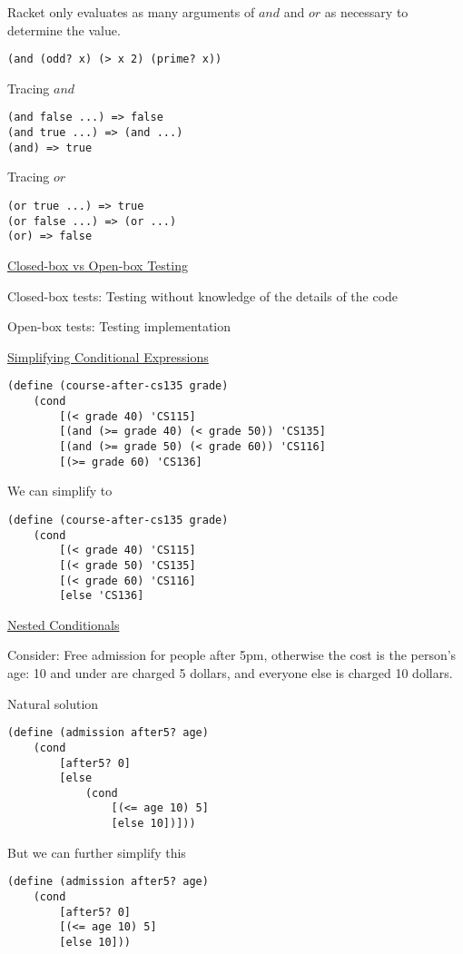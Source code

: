 \documentclass{article}
\begin{document}
Racket only evaluates as many arguments of $and$ and $or$ as necessary to determine the value. 

\begin{lstlisting}
(and (odd? x) (> x 2) (prime? x))
\end{lstlisting}

Tracing $and$
\begin{lstlisting}
(and false ...) => false
(and true ...) => (and ...)
(and) => true
\end{lstlisting}

Tracing $or$
\begin{lstlisting}
(or true ...) => true
(or false ...) => (or ...)
(or) => false
\end{lstlisting}


\underline{Closed-box vs Open-box Testing}

Closed-box tests: Testing without knowledge of the details of the code

Open-box tests: Testing implementation


\underline{Simplifying Conditional Expressions}

\begin{lstlisting}
(define (course-after-cs135 grade)
    (cond
        [(< grade 40) 'CS115]
        [(and (>= grade 40) (< grade 50)) 'CS135]
        [(and (>= grade 50) (< grade 60)) 'CS116]
        [(>= grade 60) 'CS136]
\end{lstlisting}

We can simplify to
\begin{lstlisting}
(define (course-after-cs135 grade)
    (cond 
        [(< grade 40) 'CS115]
        [(< grade 50) 'CS135]
        [(< grade 60) 'CS116]
        [else 'CS136]
\end{lstlisting}

\underline{Nested Conditionals}

Consider: Free admission for people after 5pm, otherwise the cost is the person's age: 10 and under are charged 5 dollars, and everyone else is charged 10 dollars. 

Natural solution
\begin{lstlisting}
(define (admission after5? age)
    (cond
        [after5? 0]
        [else 
            (cond
                [(<= age 10) 5]
                [else 10])]))
\end{lstlisting}

But we can further simplify this
\begin{lstlisting}
(define (admission after5? age)
    (cond
        [after5? 0]
        [(<= age 10) 5]
        [else 10]))
\end{lstlisting}
\end{document}
